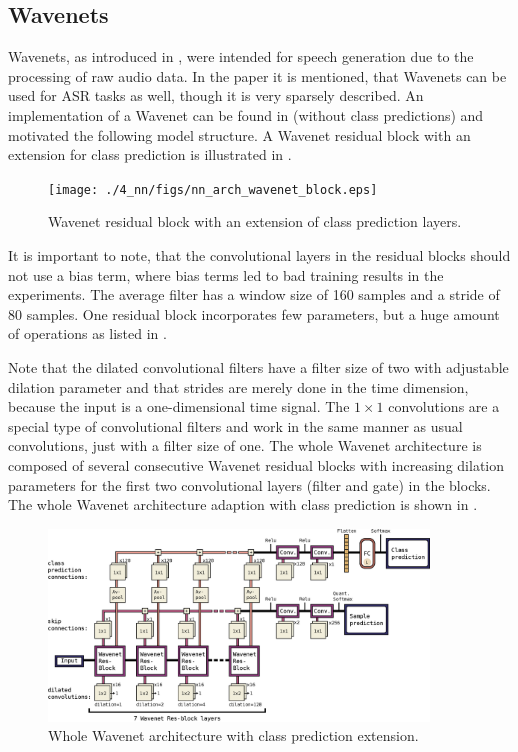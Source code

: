 \subsection{Wavenets}\label{sec:nn_arch_wavenet}
Wavenets, as introduced in \cite{Oord2016}, were intended for speech generation due to the processing of raw audio data.
In the paper it is mentioned, that Wavenets can be used for ASR tasks as well, though it is very sparsely described.
An implementation of a Wavenet can be found in \cite{Herrmann2018} (without class predictions) and motivated the following model structure.
A Wavenet residual block with an extension for class prediction is illustrated in .
\begin{figure}[!ht]
  \centering
    \texttt{[image: ./4\_nn/figs/nn\_arch\_wavenet\_block.eps]}
  \caption{Wavenet residual block \cite{Oord2016} with an extension of class prediction layers.}
  \label{fig:nn_arch_wavenet_block}
\end{figure}
\FloatBarrier
\noindent
It is important to note, that the convolutional layers in the residual blocks should not use a bias term, where bias terms led to bad training results in the experiments.
The average filter has a window size of 160 samples and a stride of 80 samples.
One residual block incorporates few parameters, but a huge amount of operations as listed in .

Note that the dilated convolutional filters have a filter size of two with adjustable dilation parameter and that strides are merely done in the time dimension, because the input is a one-dimensional time signal.
The $1 \times 1$ convolutions are a special type of convolutional filters and work in the same manner as usual convolutions, just with a filter size of one. 
The whole Wavenet architecture is composed of several consecutive Wavenet residual blocks with increasing dilation parameters for the first two convolutional layers (filter and gate) in the blocks.
The whole Wavenet architecture adaption with class prediction is shown in .
\begin{figure}[!ht]
  \centering
    \includegraphics[width=0.9\textwidth]{./4_nn/figs/nn_arch_wavenet_all.eps}
  \caption{Whole Wavenet architecture with class prediction extension.}
  \label{fig:nn_arch_wavenet_all}
\end{figure}
